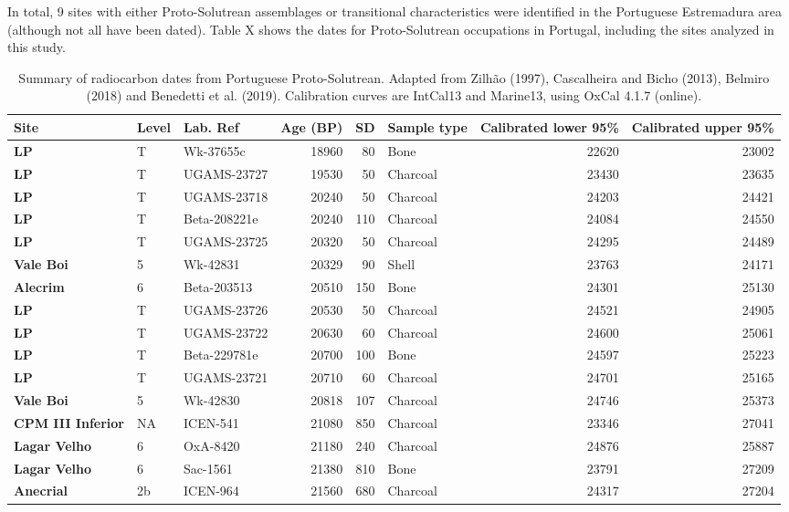 \documentclass[12pt,twoside]{reedthesis}
\begin{document}
In total, 9 sites with either Proto-Solutrean assemblages or transitional characteristics were identified in the Portuguese Estremadura area (although not all have been dated). Table X shows the dates for Proto-Solutrean occupations in Portugal, including the sites analyzed in this study.
\begin{table}

\caption{\label{tab:unnamed-chunk-1}Summary of radiocarbon dates from Portuguese Proto-Solutrean. Adapted from Zilhão (1997), Cascalheira and Bicho (2013), Belmiro (2018) and Benedetti et al. (2019). Calibration curves are IntCal13 and Marine13, using OxCal 4.1.7 (online).}
\centering
\begin{tabular}[t]{>{\bfseries}lllrrlrr}
\toprule
Site & Level & Lab. Ref & Age (BP) & SD & Sample type & Calibrated lower 95\% & Calibrated upper 95\%\\
\midrule
LP & T & Wk-37655c & 18960 & 80 & Bone & 22620 & 23002\\
LP & T & UGAMS-23727 & 19530 & 50 & Charcoal & 23430 & 23635\\
LP & T & UGAMS-23718 & 20240 & 50 & Charcoal & 24203 & 24421\\
LP & T & Beta-208221e & 20240 & 110 & Charcoal & 24084 & 24550\\
LP & T & UGAMS-23725 & 20320 & 50 & Charcoal & 24295 & 24489\\
\addlinespace
Vale Boi & 5 & Wk-42831 & 20329 & 90 & Shell & 23763 & 24171\\
Alecrim & 6 & Beta-203513 & 20510 & 150 & Bone & 24301 & 25130\\
LP & T & UGAMS-23726 & 20530 & 50 & Charcoal & 24521 & 24905\\
LP & T & UGAMS-23722 & 20630 & 60 & Charcoal & 24600 & 25061\\
LP & T & Beta-229781e & 20700 & 100 & Bone & 24597 & 25223\\
\addlinespace
LP & T & UGAMS-23721 & 20710 & 60 & Charcoal & 24701 & 25165\\
Vale Boi & 5 & Wk-42830 & 20818 & 107 & Charcoal & 24746 & 25373\\
CPM III Inferior & NA & ICEN-541 & 21080 & 850 & Charcoal & 23346 & 27041\\
Lagar Velho & 6 & OxA-8420 & 21180 & 240 & Charcoal & 24876 & 25887\\
Lagar Velho & 6 & Sac-1561 & 21380 & 810 & Bone & 23791 & 27209\\
\addlinespace
Anecrial & 2b & ICEN-964 & 21560 & 680 & Charcoal & 24317 & 27204\\

\end{tabular}
\end{table}
\end{document}
